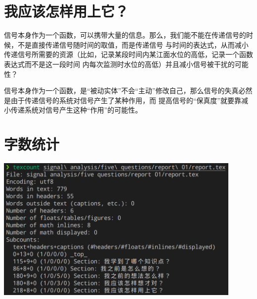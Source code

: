 \documentclass{ctexart}
\begin{document}
    \section{我应该怎样用上它？}

    信号本身作为一个函数，可以携带大量的信息。那么，我们能不能在传递信号的时候，不是直接传递信号随时间的取值，而是传递信号
    与时间的表达式，从而减小传递信号所需要的资源（比如，记录某段时间内某江面水位的高低，记录一个函数表达式而不是这一段时间
    内每次监测时水位的高低）并且减小信号被干扰的可能性？

    信号本身作为一个函数，是“被动实体”不会“主动”修改自己，那么信号的失真必然是由于传递信号的系统对信号产生了某种作用，而
    提高信号的“保真度”就要靠减小传递系统对信号产生这种“作用”的可能性。

    \section*{字数统计}

    \begin{center}
        \includegraphics[width=0.9\textwidth]{pics/word count.png}
    \end{center}
\end{document}
